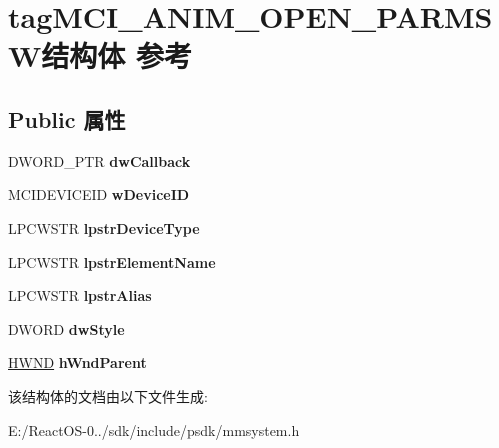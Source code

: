 \hypertarget{structtag_m_c_i___a_n_i_m___o_p_e_n___p_a_r_m_s_w}{}\section{tag\+M\+C\+I\+\_\+\+A\+N\+I\+M\+\_\+\+O\+P\+E\+N\+\_\+\+P\+A\+R\+M\+S\+W结构体 参考}
\label{structtag_m_c_i___a_n_i_m___o_p_e_n___p_a_r_m_s_w}
\subsection*{Public 属性}
\begin{DoxyCompactItemize}
\item 
\mbox{\label{structtag_m_c_i___a_n_i_m___o_p_e_n___p_a_r_m_s_w_adb921951622d52677ee68495d2aa3d5e}} 
D\+W\+O\+R\+D\+\_\+\+P\+TR {\bfseries dw\+Callback}
\item 
\mbox{\label{structtag_m_c_i___a_n_i_m___o_p_e_n___p_a_r_m_s_w_a823d8bd91dfd155fa69c73e6032a8334}} 
M\+C\+I\+D\+E\+V\+I\+C\+E\+ID {\bfseries w\+Device\+ID}
\item 
\mbox{\label{structtag_m_c_i___a_n_i_m___o_p_e_n___p_a_r_m_s_w_aafbfbb857ebb9d4b1a2a301b8109dc28}} 
L\+P\+C\+W\+S\+TR {\bfseries lpstr\+Device\+Type}
\item 
\mbox{\label{structtag_m_c_i___a_n_i_m___o_p_e_n___p_a_r_m_s_w_ac44b34476c121df5fc72f3bb3d024eb9}} 
L\+P\+C\+W\+S\+TR {\bfseries lpstr\+Element\+Name}
\item 
\mbox{\label{structtag_m_c_i___a_n_i_m___o_p_e_n___p_a_r_m_s_w_a314548b056d34690211bda2ad28c554b}} 
L\+P\+C\+W\+S\+TR {\bfseries lpstr\+Alias}
\item 
\mbox{\label{structtag_m_c_i___a_n_i_m___o_p_e_n___p_a_r_m_s_w_ae888140cd9bdd22c51857eec02274f43}} 
D\+W\+O\+RD {\bfseries dw\+Style}
\item 
\mbox{\label{structtag_m_c_i___a_n_i_m___o_p_e_n___p_a_r_m_s_w_a9e5f72afd9b0fbdc78822f7bace16b9e}} 
\hyperlink{interfacevoid}{H\+W\+ND} {\bfseries h\+Wnd\+Parent}
\end{DoxyCompactItemize}


该结构体的文档由以下文件生成\+:\begin{DoxyCompactItemize}
\item 
E\+:/\+React\+O\+S-\/0../sdk/include/psdk/mmsystem.\+h\end{DoxyCompactItemize}
